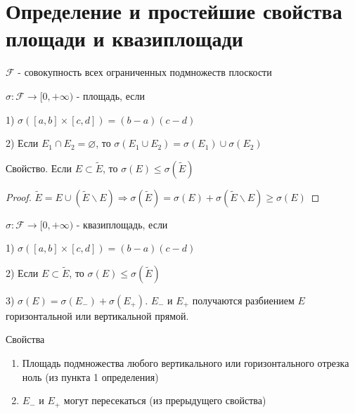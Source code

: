 \section{Определение и простейшие свойства площади и квазиплощади \href{https://youtu.be/p9C57KDo1Yg?t=6438}{\Walley}}

$\mathcal{F}$ - совокупность всех ограниченных подмножеств плоскости

\begin{conj}
    $\sigma: \mathcal{F} \to [0, +\infty)$ - площадь, если

    1) $\sigma([a, b]\times[c, d]) = (b-a)(c-d)$

    2) Если $E_1\cap E_2 = \varnothing$, то $\sigma(E_1 \cup E_2) = \sigma(E_1) \cup \sigma(E_2)$
\end{conj}

Свойство. Если $E \subset \widetilde{E}$, то
$\sigma(E) \leq \sigma(\widetilde{E})$

\begin{proof}
    $\widetilde{E} = E \cup (\widetilde{E} \backslash E) \Rightarrow
    \sigma(\widetilde{E}) = \sigma(E) + \sigma(\widetilde{E} \backslash E) \geq \sigma(E)$
\end{proof}

\begin{conj}
    $\sigma: \mathcal{F} \to [0, +\infty)$ - квазиплощадь, если

    1) $\sigma([a, b]\times[c, d]) = (b-a)(c-d)$

    2) Если $E \subset \widetilde{E}$, то $\sigma(E) \leq \sigma(\widetilde{E})$

    3) $\sigma(E) = \sigma(E_{-}) + \sigma(E_{+})$. $E_{-}$ и $E_{+}$ получаются
    разбиением $E$ горизонтальной или вертикальной прямой.
\end{conj}

Свойства
\begin{enumerate}
    \item Площадь подмножества любого вертикального или горизонтального отрезка ноль (из пункта 1 определения)
    \item $E_{-}$ и $E_{+}$ могут пересекаться (из прерыдущего свойства)
\end{enumerate}